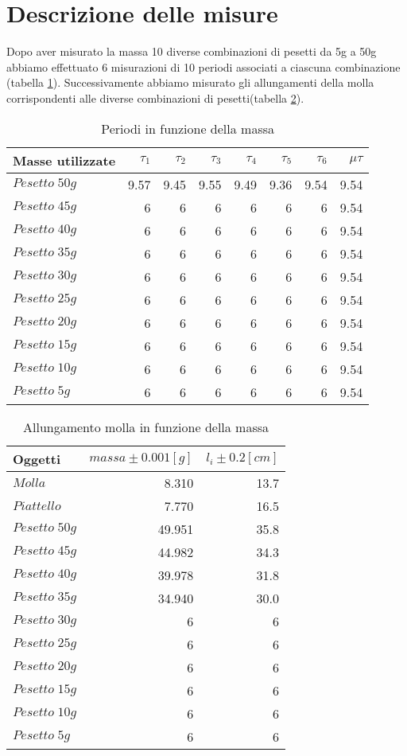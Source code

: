 \documentclass{article}
\begin{document}
	\section{Descrizione delle misure}
		Dopo aver misurato la massa 10 diverse combinazioni di pesetti da 5g a 50g abbiamo effettuato 6
		misurazioni di 10 periodi associati a ciascuna combinazione (tabella \ref{tabella periodi massa}). Successivamente abbiamo misurato gli allungamenti della molla corrispondenti alle diverse combinazioni di pesetti(tabella \ref{tabella allungamento massa}).
	
	\begin{table}
		\centering
		\begin{tabular}{lrrrrrrr}
			Masse utilizzate&$\tau_1$&$\tau_2$&$\tau_3$&$\tau_4$&$\tau_5$&$\tau_6$&$\mu\tau$\\
			\hline
			\hline
			$Pesetto\;50g$&9.57&9.45&9.55&9.49&9.36&9.54&9.54\\
			$Pesetto\;45g$&6&6&6&6&6&6&9.54\\
			$Pesetto\;40g$&6&6&6&6&6&6&9.54\\
			$Pesetto\;35g$&6&6&6&6&6&6&9.54\\
			$Pesetto\;30g$&6&6&6&6&6&6&9.54\\
			$Pesetto\;25g$&6&6&6&6&6&6&9.54\\
			$Pesetto\;20g$&6&6&6&6&6&6&9.54\\
			$Pesetto\;15g$&6&6&6&6&6&6&9.54\\
			$Pesetto\;10g$&6&6&6&6&6&6&9.54\\
			$Pesetto\;5g$&6&6&6&6&6&6&9.54\\
		\end{tabular}
		\caption{Periodi in funzione della massa}
		\label{tabella periodi massa}
	\end{table}
	
	\begin{table}
	\centering
	\begin{tabular}{lrr}
		Oggetti&$massa\pm0.001[g]$&$l_i\pm0.2[cm]$\\
		\hline
		\hline
		$Molla$&8.310&13.7\\
		$Piattello$&7.770&16.5\\
		$Pesetto\;50g$&49.951&35.8\\
		$Pesetto\;45g$&44.982&34.3\\
		$Pesetto\;40g$&39.978&31.8\\
		$Pesetto\;35g$&34.940&30.0\\
		$Pesetto\;30g$&6&6\\
		$Pesetto\;25g$&6&6\\
		$Pesetto\;20g$&6&6\\
		$Pesetto\;15g$&6&6\\
		$Pesetto\;10g$&6&6\\
		$Pesetto\;5g$&6&6\\
	\end{tabular}
	\caption{Allungamento molla in funzione della massa}
	\label{tabella allungamento massa}
	\end{table}
	
\end{document}
